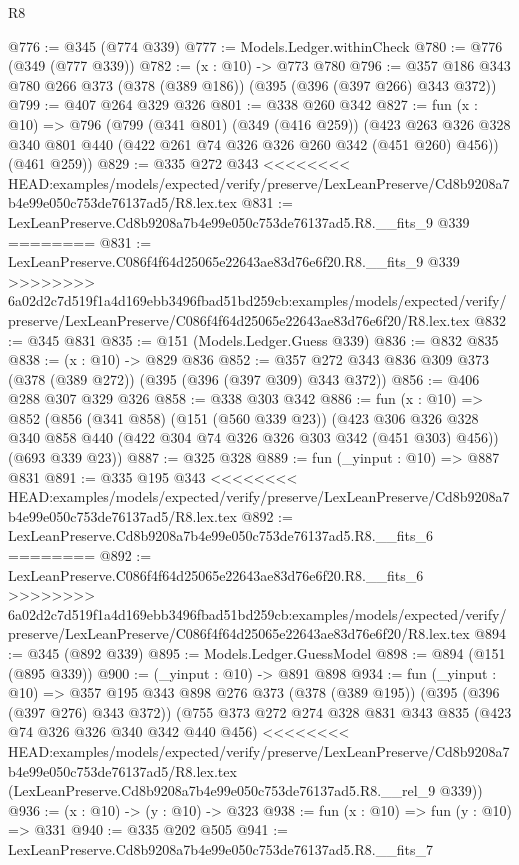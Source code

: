 \begin{lexlean}{R8}
\begin{coremodule}
{{{{{{{{{{{{{{{{{{{{{{{@776 := @345 (@774 @339)
@777 := Models.Ledger.withinCheck
@780 := @776 (@349 (@777 @339))
@782 := (x : @10) -> @773 @780
@796 := @357 @186 @343 @780 @266 @373 (@378 (@389 @186)) (@395 (@396 (@397 @266) @343 @372))
@799 := @407 @264 @329 @326
@801 := @338 @260 @342
@827 := fun (x : @10) =>
  @796
    (@799
      (@341 @801)
      (@349 (@416 @259))
      (@423 @263 @326 @328 @340 @801 @440 (@422 @261 @74 @326 @326 @260 @342 (@451 @260) @456))
      (@461 @259))
@829 := @335 @272 @343
<<<<<<<< HEAD:examples/models/expected/verify/preserve/LexLeanPreserve/Cd8b9208a7b4e99e050c753de76137ad5/R8.lex.tex
@831 := LexLeanPreserve.Cd8b9208a7b4e99e050c753de76137ad5.R8.__fits_9 @339
========
@831 := LexLeanPreserve.C086f4f64d25065e22643ae83d76e6f20.R8.__fits_9 @339
>>>>>>>> 6a02d2c7d519f1a4d169ebb3496fbad51bd259cb:examples/models/expected/verify/preserve/LexLeanPreserve/C086f4f64d25065e22643ae83d76e6f20/R8.lex.tex
@832 := @345 @831
@835 := @151 (Models.Ledger.Guess @339)
@836 := @832 @835
@838 := (x : @10) -> @829 @836
@852 := @357 @272 @343 @836 @309 @373 (@378 (@389 @272)) (@395 (@396 (@397 @309) @343 @372))
@856 := @406 @288 @307 @329 @326
@858 := @338 @303 @342
@886 := fun (x : @10) =>
  @852
    (@856
      (@341 @858)
      (@151 (@560 @339 @23))
      (@423 @306 @326 @328 @340 @858 @440 (@422 @304 @74 @326 @326 @303 @342 (@451 @303) @456))
      (@693 @339 @23))
@887 := @325 @328
@889 := fun (_yinput : @10) => @887 @831
@891 := @335 @195 @343
<<<<<<<< HEAD:examples/models/expected/verify/preserve/LexLeanPreserve/Cd8b9208a7b4e99e050c753de76137ad5/R8.lex.tex
@892 := LexLeanPreserve.Cd8b9208a7b4e99e050c753de76137ad5.R8.__fits_6
========
@892 := LexLeanPreserve.C086f4f64d25065e22643ae83d76e6f20.R8.__fits_6
>>>>>>>> 6a02d2c7d519f1a4d169ebb3496fbad51bd259cb:examples/models/expected/verify/preserve/LexLeanPreserve/C086f4f64d25065e22643ae83d76e6f20/R8.lex.tex
@894 := @345 (@892 @339)
@895 := Models.Ledger.GuessModel
@898 := @894 (@151 (@895 @339))
@900 := (_yinput : @10) -> @891 @898
@934 := fun (_yinput : @10) =>
  @357
    @195
    @343
    @898
    @276
    @373
    (@378 (@389 @195))
    (@395 (@396 (@397 @276) @343 @372))
    (@755
      @373
      @272
      @274
      @328
      @831
      @343
      @835
      (@423 @74 @326 @326 @340 @342 @440 @456)
<<<<<<<< HEAD:examples/models/expected/verify/preserve/LexLeanPreserve/Cd8b9208a7b4e99e050c753de76137ad5/R8.lex.tex
      (LexLeanPreserve.Cd8b9208a7b4e99e050c753de76137ad5.R8.__rel_9 @339))
@936 := (x : @10) -> (y : @10) -> @323
@938 := fun (x : @10) => fun (y : @10) => @331
@940 := @335 @202 @505
@941 := LexLeanPreserve.Cd8b9208a7b4e99e050c753de76137ad5.R8.__fits_7
}}}}}}}}}}}}}}}}}}}}}}}
\end{coremodule}
\end{lexlean}
